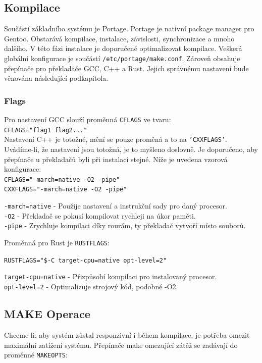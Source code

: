 \documentclass[12pt,a4paper,twoside,]{article}
\begin{document}
{{{{{{{\newpage
\subsection{\textsf{Kompilace}}
Součástí základního systému je Portage. Portage je nativní package manager pro Gentoo.
Obstarává kompilace, instalace, závislosti, synchronizace a mnoho dalšího. V této fázi instalace
je doporučené optimalizovat kompilace. Veškerá globální konfigurace je součástí \texttt{/etc/portage/make.conf}.
Zároveň obsahuje přepínače pro překladače GCC, C++ a Rust. Jejich správnému nastavení bude věnována následující podkapitola.

\subsubsection{\textsf{Flags}}
Pro nastavení GCC slouží proměnná \texttt{CFLAGS} ve tvaru:\\ \hspace*{1.5em}\texttt{CFLAGS="flag1 flag2..."}\\Nastavení C++ je totožné, mění se pouze proměná a to na \texttt{'CXXFLAGS'}.
Uvádíme-li, že nastavení jsou totožná, je to myšleno doslovně. Je doporučeno, aby přepínače u překladačů byli při instalaci stejné. Níže je uvedena
vzorová konfigurace:\\
\hspace*{1.5em}\texttt{CFLAGS="-march=native -O2 -pipe"}\\
\hspace*{1.5em}\texttt{CXXFLAGS="-march=native -O2 -pipe"}

\hspace{-1.5em}\texttt{-march=native} - Použije nastavení a instrukční sady pro daný procesor.\\
\texttt{-O2} - Překladač se pokusí kompilovat rychleji na úkor paměti.\\
\texttt{-pipe} - Zrychluje kompilaci díky rourám, ty překladač vytvoří místo souborů.

\hspace{-1.5em}Proměnná pro Rust je \texttt{RUSTFLAGS}:

\texttt{RUSTFLAGS="\$-C target-cpu=native opt-level=2"}

\hspace{-1.5em}\texttt{target-cpu=native} - Přizpůsobí kompilaci pro instalovaný procesor.\\
\texttt{opt-level=2} - Optimalizuje strojový kód, podobné -O2. %
\subsection{\textsf{MAKE Operace}}
Chceme-li, aby systém zůstal responzivní i během kompilace, je potřeba omezit maximální zatížení systému.
Přepínače make omezující zátěž se zadávají do proměnné \texttt{MAKEOPTS}:

}}}}}}}
\end{document}

